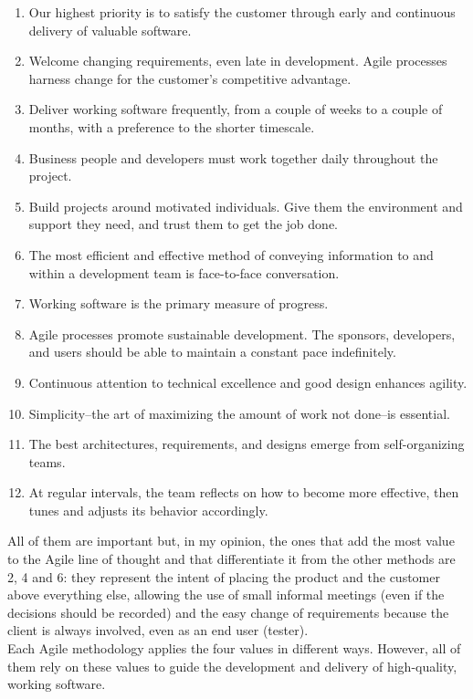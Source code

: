 	\begin{enumerate}
		\item Our highest priority is to satisfy the customer through early and continuous delivery of valuable software.
		\item Welcome changing requirements, even late in development. Agile processes harness change for the customer's competitive advantage.
		\item Deliver working software frequently, from a couple of weeks to a couple of months, with a preference to the shorter timescale.
		\item Business people and developers must work together daily throughout the project.	
		\item Build projects around motivated individuals. Give them the environment and support they need, and trust them to get the job done.
		\item The most efficient and effective method of conveying information to and within a development team is face-to-face conversation.
		\item Working software is the primary measure of progress.
		\item Agile processes promote sustainable development. The sponsors, developers, and users should be able to maintain a constant pace indefinitely.	
		\item Continuous attention to technical excellence and good design enhances agility.
		\item Simplicity--the art of maximizing the amount of work not done--is essential.
		\item The best architectures, requirements, and designs emerge from self-organizing teams.
		\item At regular intervals, the team reflects on how to become more effective, then tunes and adjusts its behavior accordingly.
	\end{enumerate}
	All of them are important but, in my opinion, the ones that add the most value to the Agile line of thought and that differentiate it from the other methods are 2, 4 and 6: they represent the intent of placing the product and the customer above everything else, allowing the use of small informal meetings (even if the decisions should be recorded) and the easy change of requirements because the client is always involved, even as an end user (tester).\\
	Each Agile methodology applies the four values in different ways.
	However, all of them rely on these values to guide the development and delivery of high-quality, working software.

